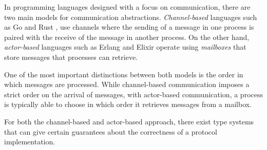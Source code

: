 \label{sec:typed-process-communication}

In programming languages designed with a focus on communication, there are two main models for communication abstractions.
\emph{Channel-based} languages such as Go \cite{thegodeveloperteamGoProgrammingLanguage} and Rust \cite{matsakisRustLanguage2014}, use channels where the
sending of a message in one process is paired with the receive of the message in another process.
On the other hand, \emph{actor-based} languages such as Erlang \cite{armstrongHistoryErlang2007a} and Elixir \cite{theelixirteamElixirLanguage} operate
using \emph{mailboxes} that store messages that processes can retrieve.


One of the most important distinctions between both models is the order in which messages are processed.
While channel-based communication imposes a strict order on the arrival of messages,
with actor-based communication, a process is typically able to choose in which order it retrieves messages from a mailbox.

For both the channel-based and actor-based approach, there exist type systems that can give certain guarantees about the correctness of a protocol implementation.

